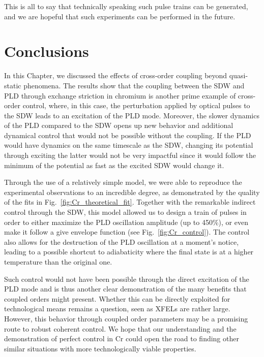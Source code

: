 This is all to say that technically speaking such pulse trains can be generated, and we are hopeful that such experiments can be performed in the future.

\section{Conclusions}
In this Chapter, we discussed the effects of cross-order coupling beyond quasi-static phenomena.
The results show that the coupling between the SDW and PLD through exchange striction in chromium is another prime example of cross-order control, where, in this case, the perturbation applied by optical pulses to the SDW leads to an excitation of the PLD mode.
Moreover, the slower dynamics of the PLD compared to the SDW opens up new behavior and additional dynamical control that would not be possible without the coupling.
If the PLD would have dynamics on the same timescale as the SDW, changing its potential through exciting the latter would not be very impactful since it would follow the minimum of the potential as fast as the excited SDW would change it.

Through the use of a relatively simple model, we were able to reproduce the experimental observations to an incredible degree, as demonstrated by the quality of the fits in Fig.~\ref{fig:Cr_theoretical_fit}.
Together with the remarkable indirect control through the SDW, this model allowed us to design a train of pulses in order to either maximize the PLD oscillation amplitude (up to 450\%), or even make it follow a give envelope function (see Fig.~\ref{fig:Cr_control}).
The control also allows for the destruction of the PLD oscillation at a moment's notice, leading to a possible shortcut to adiabaticity where the final state is at a higher temperature than the original one.

Such control would not have been possible through the direct excitation of the PLD mode and is thus another clear demonstration of the many benefits that coupled orders might present.
Whether this can be directly exploited for technological means remains a question, seen as XFELs are rather large.
However, this behavior through coupled order parameters may be a promising route to robust coherent control.
We hope that our understanding and the demonstration of perfect control in Cr could open the road to finding other similar situations with more technologically viable properties.   
